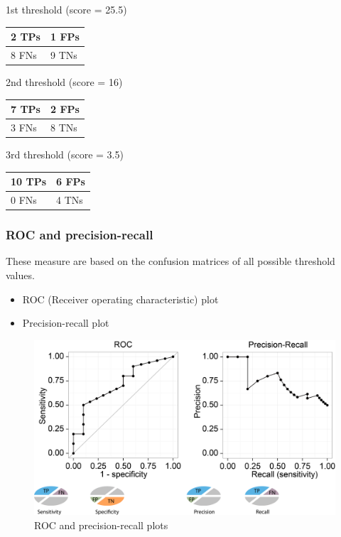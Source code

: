 \noindent
1st threshold (score = 25.5)
\begin{table}[H]
\footnotesize
\begin{tabular}{|l|l|}
\hline
2 TPs & 1 FPs \\ \hline
8 FNs & 9 TNs \\ \hline
\end{tabular}
\end{table}

\noindent
2nd threshold (score = 16)
\begin{table}[H]
\footnotesize
\begin{tabular}{|l|l|}
\hline
7 TPs & 2 FPs \\ \hline
3 FNs & 8 TNs \\ \hline
\end{tabular}
\end{table}

\noindent
3rd threshold (score = 3.5)
\begin{table}[H]
\footnotesize
\begin{tabular}{|l|l|}
\hline
10 TPs & 6 FPs \\ \hline
0 FNs & 4 TNs \\ \hline
\end{tabular}
\end{table}

%
%
\subsubsection*{ROC and precision-recall}
These measure are based on the confusion matrices of all possible threshold values.

\begin{itemize}
\item ROC (Receiver operating characteristic) plot
\item Precision-recall plot
\end{itemize}

\begin{figure}[H]
  \centering
      \includegraphics[width=0.6 \textwidth]{fig07/roc_precision-recall.png}
  \caption{ROC and precision-recall plots}
\end{figure}

